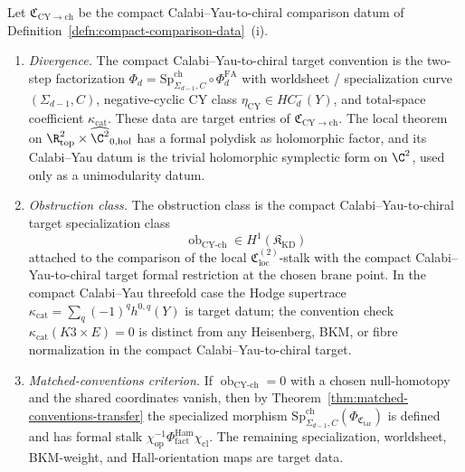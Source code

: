\begin{thm}\label{thm:divergence-volIII}
  Let \(\mathfrak C_{\mathrm{CY\to ch}}\) be the compact Calabi--Yau-to-chiral comparison datum of
  Definition~\ref{defn:compact-comparison-data}~(i).
  \begin{enumerate}[label=(\roman*)]
    \item \emph{Divergence.}  The compact Calabi--Yau-to-chiral target convention is the two-step
      factorization
      \(\Phi_d=\mathrm{Sp}^{\mathrm{ch}}_{\Sigma_{d-1},C}\circ
      \Phi^{\mathrm{FA}}_d\)
      with worldsheet / specialization curve
      \((\Sigma_{d-1},C)\), negative-cyclic CY class
      \(\eta_{\mathrm{CY}}\in HC^-_d(Y)\), and total-space
      coefficient \(\kappa_{\mathrm{cat}}\).  These data are target
      entries of \(\mathfrak C_{\mathrm{CY\to ch}}\).  The local theorem
      on
      \(\R^2_{\mathrm{top}}\times\widehat{\C^2}_{0,\mathrm{hol}}\)
      has a formal polydisk as holomorphic factor, and its Calabi--Yau
      datum is the trivial holomorphic symplectic form on
      \(\C^2\), used only as a unimodularity datum.
    \item \emph{Obstruction class.}  The obstruction class is
      the compact Calabi--Yau-to-chiral target specialization class
      \[
        \operatorname{ob}_{\mathrm{CY\mbox{-}ch}}
          \in
          H^1(\mathfrak K_{\mathrm{KD}})
      \]
      attached to the comparison of the local
      \(\mathfrak C_{\mathrm{loc}}^{(2)}\)-stalk with the compact Calabi--Yau-to-chiral target
      formal restriction at the chosen brane point.  In the compact
      Calabi--Yau threefold case the Hodge supertrace
      \(\kappa_{\mathrm{cat}}=\sum_q(-1)^qh^{0,q}(Y)\) is target
      datum; the convention check
      \(\kappa_{\mathrm{cat}}(K3\times E)=0\) is distinct from any
      Heisenberg, BKM, or fibre normalization in the compact Calabi--Yau-to-chiral target.
    \item \emph{Matched-conventions criterion.}  If
      \(\operatorname{ob}_{\mathrm{CY\mbox{-}ch}}=0\) with a chosen
      null-homotopy and the shared coordinates vanish, then by
      Theorem~\ref{thm:matched-conventions-transfer} the specialized
      morphism
      \(\mathrm{Sp}^{\mathrm{ch}}_{\Sigma_{d-1},C}(\Phi_{\mathfrak C_{\mathrm{tar}}})\)
      is defined and has formal stalk
      \(\chi_{\mathrm{op}}^{-1}\Phi^{\mathrm{Ham}}_{\mathrm{fact}}
      \chi_{\mathrm{cl}}\).  The remaining specialization,
      worldsheet, BKM-weight, and Hall-orientation maps are target
      data.
  \end{enumerate}
\end{thm}

